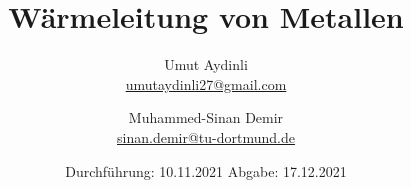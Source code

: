 

\subject{V204}
\title{Wärmeleitung von Metallen}
\author{Umut Aydinli \\
 \href{mailto:umutaydinli27@gmail.com}{umutaydinli27@gmail.com}
 \and Muhammed-Sinan Demir \\
 \href{mailto:sinan.demir@tu-dortmund.de}{sinan.demir@tu-dortmund.de}
 }
\date{
  Durchführung: 10.11.2021
  \hspace{3em}
  Abgabe: 17.12.2021
}




\maketitle
\tableofcontents
\newpage




\newpage





\nocite{*}
\printbibliography{}

